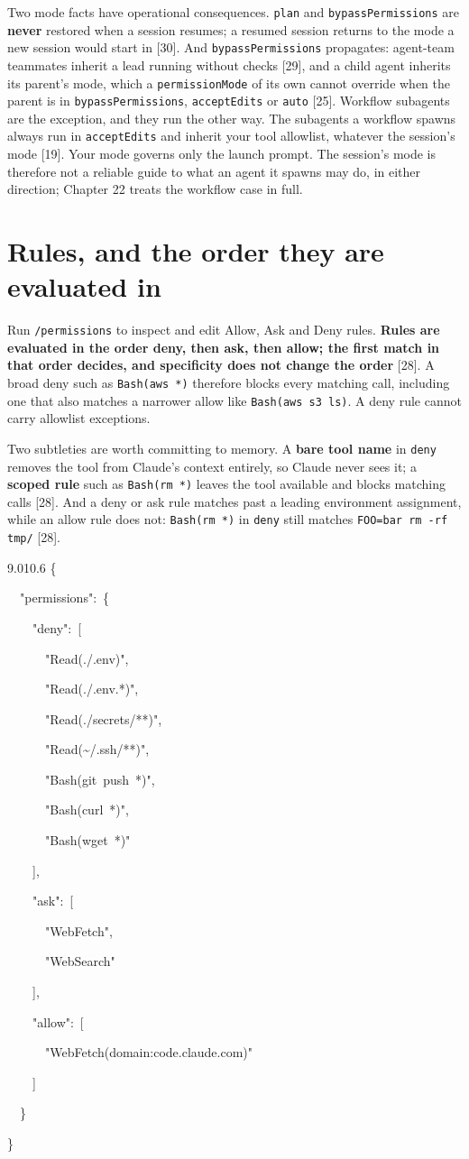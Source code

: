 \documentclass[11pt,a4paper,twoside,openany]{book}
\newcommand{\cl}[1]{\noindent\mbox{#1}\par}
\begin{document}
Two mode facts have operational consequences. \texttt{plan} and \texttt{bypass\allowbreak{}Permissions} are \textbf{never} restored when a session resumes; a resumed session returns to the mode a new session would start in [30]. And \texttt{bypass\allowbreak{}Permissions} propagates: agent-team teammates inherit a lead running without checks [29], and a child agent inherits its parent's mode, which a \texttt{permission\allowbreak{}Mode} of its own cannot override when the parent is in \texttt{bypass\allowbreak{}Permissions}, \texttt{accept\allowbreak{}Edits} or \texttt{auto} [25]. Workflow subagents are the exception, and they run the other way. The subagents a workflow spawns always run in \texttt{accept\allowbreak{}Edits} and inherit your tool allowlist, whatever the session's mode [19]. Your mode governs only the launch prompt. The session's mode is therefore not a reliable guide to what an agent it spawns may do, in either direction; Chapter 22 treats the workflow case in full.


\FloatBarrier
\setcounter{section}{1}
\section{Rules, and the order they are evaluated in}

Run \texttt{/\allowbreak{}permissions} to inspect and edit Allow, Ask and Deny rules. \textbf{Rules are evaluated in the order deny, then ask, then allow; the first match in that order decides, and specificity does not change the order} [28]. A broad deny such as \texttt{Bash(aws *)} therefore blocks every matching call, including one that also matches a narrower allow like \texttt{Bash(aws s3\allowbreak{} ls)}. A deny rule cannot carry allowlist exceptions.


Two subtleties are worth committing to memory. A \textbf{bare tool name} in \texttt{deny} removes the tool from Claude's context entirely, so Claude never sees it; a \textbf{scoped rule} such as \texttt{Bash(rm *)} leaves the tool available and blocks matching calls [28]. And a deny or ask rule matches past a leading environment assignment, while an allow rule does not: \texttt{Bash(rm *)} in \texttt{deny} still matches \texttt{FOO=\allowbreak{}bar rm -\allowbreak{}rf tmp/\allowbreak{}} [28].


\begin{codeblock}{9.0}{10.6}
\cl{\{}
\cl{~~"permissions":~\{}
\cl{~~~~"deny":~[}
\cl{~~~~~~"Read(./.env)",}
\cl{~~~~~~"Read(./.env.*)",}
\cl{~~~~~~"Read(./secrets/**)",}
\cl{~~~~~~"Read(\textasciitilde{}/.ssh/**)",}
\cl{~~~~~~"Bash(git~push~*)",}
\cl{~~~~~~"Bash(curl~*)",}
\cl{~~~~~~"Bash(wget~*)"}
\cl{~~~~],}
\cl{~~~~"ask":~[}
\cl{~~~~~~"WebFetch",}
\cl{~~~~~~"WebSearch"}
\cl{~~~~],}
\cl{~~~~"allow":~[}
\cl{~~~~~~"WebFetch(domain:code.claude.com)"}
\cl{~~~~]}
\cl{~~\}}
\cl{\}}
\end{codeblock}
\end{document}
